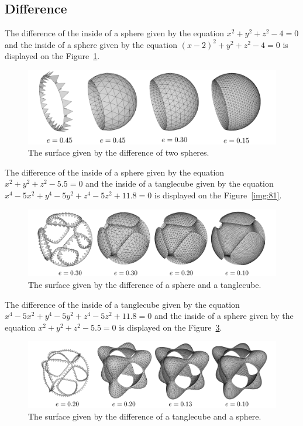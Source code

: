 \subsection{Difference}

The difference of the inside of a sphere given by the equation
$x^2+y^2+z^2-4=0$ and the inside of a sphere given by the 
equation $(x-2)^2+y^2+z^2-4=0$ is displayed on the Figure~\ref{img:80}.
\begin{figure}[h!]
    \centerline{\includegraphics[scale=0.49]{images/img80}}
    \caption[The surface given by the difference of two spheres]
    {The surface given by the difference of two spheres.}
    \label{img:80}
\end{figure}

The difference of the inside of a sphere given by the equation
$x^2+y^2+z^2-5.5=0$ and the inside of a tanglecube given by the 
equation $x^4-5x^2+y^4-5y^2+z^4-5z^2+11.8=0$ is displayed on the Figure~\ref{img:81}.
\begin{figure}[h!]
    \centerline{\includegraphics[scale=0.49]{images/img82}}
    \caption[The surface given by the difference of a sphere and a tanglecube]
    {The surface given by the difference of a sphere and a tanglecube.}
    \label{img:82}
\end{figure}

The difference of the inside of a tanglecube given by the 
equation $x^4-5x^2+y^4-5y^2+z^4-5z^2+11.8=0$ and the inside 
of a sphere given by the equation
$x^2+y^2+z^2-5.5=0$ is displayed on the Figure~\ref{img:83}.
\begin{figure}[h!]
    \centerline{\includegraphics[scale=0.49]{images/img83}}
    \caption[The surface given by the difference of a tanglecube and a sphere]
    {The surface given by the difference of a tanglecube and a sphere.}
    \label{img:83}
\end{figure}

